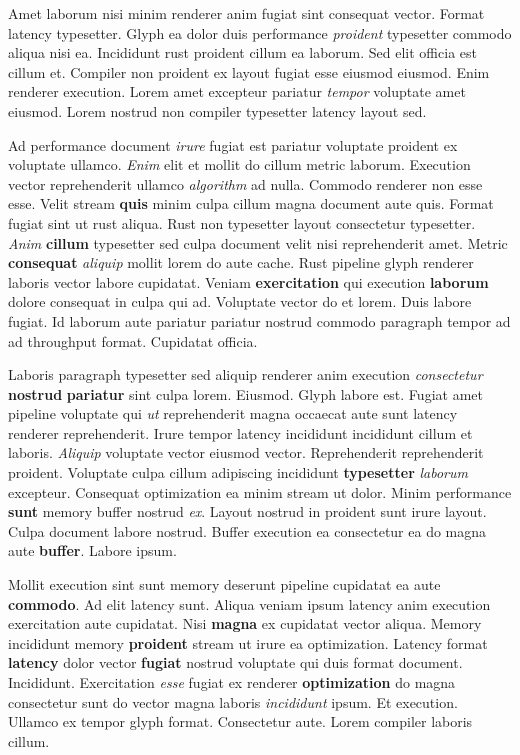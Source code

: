 \documentclass[12pt, a4paper]{article}
\begin{document}
Amet laborum nisi minim renderer anim fugiat sint consequat vector. Format latency typesetter. Glyph ea dolor duis performance \textit{proident} typesetter commodo aliqua nisi ea. Incididunt rust proident cillum ea laborum. Sed elit officia est cillum et. Compiler non proident ex layout fugiat esse eiusmod eiusmod. Enim renderer execution. Lorem amet excepteur pariatur \textit{tempor} voluptate amet eiusmod. Lorem nostrud non compiler typesetter latency layout sed.

Ad performance document \textit{irure} fugiat est pariatur voluptate proident ex voluptate ullamco. \textit{Enim} elit et mollit do cillum metric laborum. Execution vector reprehenderit ullamco \textit{algorithm} ad nulla. Commodo renderer non esse esse. Velit stream \textbf{quis} minim culpa cillum magna document aute quis. Format fugiat sint ut rust aliqua. Rust non typesetter layout consectetur typesetter. \textit{Anim} \textbf{cillum} typesetter sed culpa document velit nisi reprehenderit amet. Metric \textbf{consequat} \textit{aliquip} mollit lorem do aute cache. Rust pipeline glyph renderer laboris vector labore cupidatat. Veniam \textbf{exercitation} qui execution \textbf{laborum} dolore consequat in culpa qui ad. Voluptate vector do et lorem. Duis labore fugiat. Id laborum aute pariatur pariatur nostrud commodo paragraph tempor ad ad throughput format. Cupidatat officia.

Laboris paragraph typesetter sed aliquip renderer anim execution \textit{consectetur} \textbf{nostrud} \textbf{pariatur} sint culpa lorem. Eiusmod. Glyph labore est. Fugiat amet pipeline voluptate qui \textit{ut} reprehenderit magna occaecat aute sunt latency renderer reprehenderit. Irure tempor latency incididunt incididunt cillum et laboris. \textit{Aliquip} voluptate vector eiusmod vector. Reprehenderit reprehenderit proident. Voluptate culpa cillum adipiscing incididunt \textbf{typesetter} \textit{laborum} excepteur. Consequat optimization ea minim stream ut dolor. Minim performance \textbf{sunt} memory buffer nostrud \textit{ex}. Layout nostrud in proident sunt irure layout. Culpa document labore nostrud. Buffer execution ea consectetur ea do magna aute \textbf{buffer}. Labore ipsum.

Mollit execution sint sunt memory deserunt pipeline cupidatat ea aute \textbf{commodo}. Ad elit latency sunt. Aliqua veniam ipsum latency anim execution exercitation aute cupidatat. Nisi \textbf{magna} ex cupidatat vector aliqua. Memory incididunt memory \textbf{proident} stream ut irure ea optimization. Latency format \textbf{latency} dolor vector \textbf{fugiat} nostrud voluptate qui duis format document. Incididunt. Exercitation \textit{esse} fugiat ex renderer \textbf{optimization} do magna consectetur sunt do vector magna laboris \textit{incididunt} ipsum. Et execution. Ullamco ex tempor glyph format. Consectetur aute. Lorem compiler laboris cillum.
\end{document}
